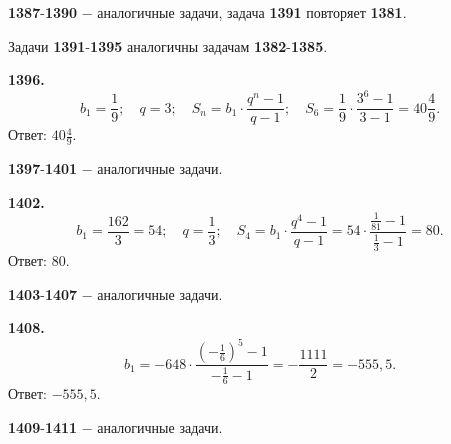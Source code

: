 \textbf{1387}-\textbf{1390} $-$ аналогичные задачи, задача \textbf{1391} повторяет \textbf{1381}.

Задачи \textbf{1391}-\textbf{1395} аналогичны задачам \textbf{1382}-\textbf{1385}.

\textbf{1396.} $$b_1=\frac{1}{9};\quad q=3;\quad S_n=b_1\cdot\frac{q^n-1}{q-1};\quad S_6=\frac{1}{9}\cdot\frac{3^6-1}{3-1}=40\frac{4}{9}.$$ \newline \null \hspace*{\fill} Ответ: $40\frac{4}{9}$. 

\textbf{1397}-\textbf{1401} $-$ аналогичные задачи.

\textbf{1402.} $$b_1=\frac{162}{3}=54;\quad q=\frac{1}{3};\quad S_4=b_1\cdot\frac{q^4-1}{q-1}=54\cdot\frac{\frac{1}{81}-1}{\frac{1}{3}-1}=80.$$ \newline \null \hspace*{\fill} Ответ: $80$.

\textbf{1403}-\textbf{1407} $-$ аналогичные задачи.

\textbf{1408.} $$b_1=-648\cdot\frac{\left(-\frac{1}{6}\right)^5-1}{-\frac{1}{6}-1}=-\frac{1111}{2}=-555,5.$$ \newline \null \hspace*{\fill} Ответ: $-555,5$.

\textbf{1409}-\textbf{1411} $-$ аналогичные задачи.
